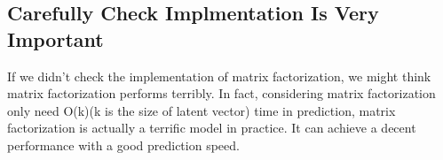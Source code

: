 \documentclass[12pt]{article}
\begin{document}
\subsection{Carefully Check Implmentation Is Very Important}
If we didn't check the implementation of matrix factorization, we might think matrix factorization performs terribly. In fact, considering matrix factorization only need O(k)(k is the size of latent vector) time in prediction, matrix factorization is actually a terrific model in practice. It can achieve a decent performance with a good prediction speed.





	
\end{document}
